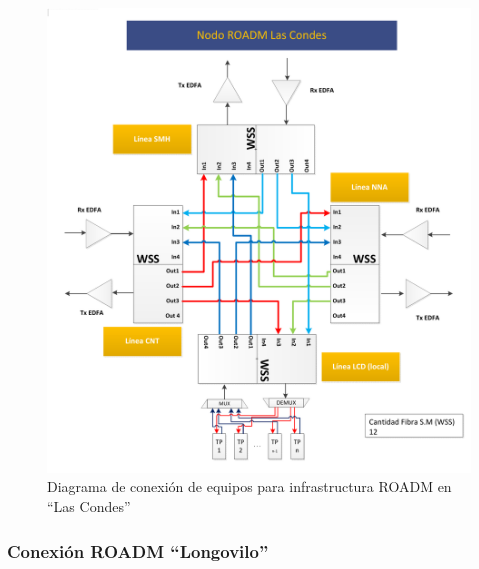 \begin{figure}[H]
  \centering
  \includegraphics[width=17cm]{Imagenes/LCD.pdf}
  \caption{Diagrama de conexión de equipos para infrastructura ROADM
    en ``Las Condes''}
  \label{fig:drlcd}
\end{figure}

\subsubsection{Conexión ROADM ``Longovilo''}
\label{sec:drlong}

